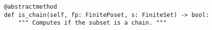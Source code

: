 \par\begin{minipage}{60ex}
\begin{verbatim}
@abstractmethod
def is_chain(self, fp: FinitePoset, s: FiniteSet) -> bool:
    """ Computes if the subset is a chain. """
\end{verbatim}
\end{minipage}\par